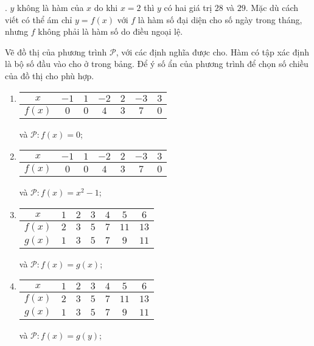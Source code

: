 . $y$ không là hàm của $x$ do khi $x = 2$ thì $y$ có hai giá trị $28$ và $29$. Mặc dù cách viết có thể ám chỉ $y=f(x)$ với $f$ là hàm số đại diện cho số ngày trong tháng, nhưng $f$ không phải là hàm số do điều ngoại lệ.

 Vẽ đồ thị của phương trình $\mathcal{P}$, với các định nghĩa được cho. Hàm có tập xác định là bộ số đầu vào cho ở trong bảng. Để ý số ẩn của phương trình để chọn số chiều của đồ thị cho phù hợp.

\begin{enumerate}
   \item
   \begin{tabular}{|c|c|c|c|c|c|c|}
      \hline
      $x$ & $-1$ & $1$ & $-2$ & $2$ & $-3$ & $3$\\
      \hline
      $f(x)$ & $0$ & $0$ & $4$ & $3$ & $7$ & $0$\\
      \hline
   \end{tabular} và $\mathcal{P}: f(x) = 0$;

   \item
   \begin{tabular}{|c|c|c|c|c|c|c|}
      \hline
      $x$ & $-1$ & $1$ & $-2$ & $2$ & $-3$ & $3$\\
      \hline
      $f(x)$ & $0$ & $0$ & $4$ & $3$ & $7$ & $0$\\
      \hline
   \end{tabular} và $\mathcal{P}: f(x) = x^2 - 1$;

   \item
   \begin{tabular}{|c|c|c|c|c|c|c|}
      \hline
      $x$ & $1$ & $2$ & $3$ & $4$ & $5$ & $6$\\
      \hline
      $f(x)$ & $2$ & $3$ & $5$ & $7$ & $11$ & $13$\\
      \hline
      $g(x)$ & $1$ & $3$ & $5$ & $7$ & $9$ & $11$\\
      \hline
   \end{tabular} và $\mathcal{P}: f(x) = g(x)$;

   \item
   \begin{tabular}{|c|c|c|c|c|c|c|}
      \hline
      $x$ & $1$ & $2$ & $3$ & $4$ & $5$ & $6$\\
      \hline
      $f(x)$ & $2$ & $3$ & $5$ & $7$ & $11$ & $13$\\
      \hline
      $g(x)$ & $1$ & $3$ & $5$ & $7$ & $9$ & $11$\\
      \hline
   \end{tabular} và $\mathcal{P}: f(x) = g(y)$;


\end{enumerate}
